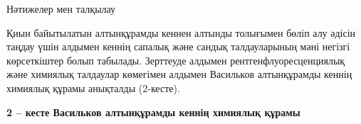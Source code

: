 Нәтижелер мен талқылау

Қиын байытылатын алтынқұрамды кеннен алтынды толығымен бөліп алу әдісін
таңдау үшін алдымен кеннің сапалық және сандық талдауларының мәні
негізгі көрсеткіштер болып табылады. Зерттеуде алдымен
рентгенфлуоресценциялық және химиялық талдаулар көмегімен алдымен
Васильков алтынқұрамды кеннің химиялық құрамы анықталды (2-кесте).

{\bfseries 2 -- кесте Васильков алтынқұрамды кеннің химиялық құрамы}

% 
% 
% 
